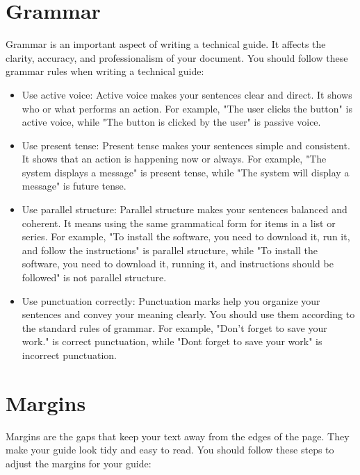\documentclass[12pt]{article}
\begin{document}
\pagebreak

\section{Grammar}

Grammar is an important aspect of writing a technical guide. It affects the clarity, accuracy, and professionalism of your document. You should follow these grammar rules when writing a technical guide:

\begin{itemize}
    \item Use active voice: Active voice makes your sentences clear and direct. It shows who or what performs an action. For example, "The user clicks the button" is active voice, while "The button is clicked by the user" is passive voice.
    \item Use present tense: Present tense makes your sentences simple and consistent. It shows that an action is happening now or always. For example, "The system displays a message" is present tense, while "The system will display a message" is future tense.
    \item Use parallel structure: Parallel structure makes your sentences balanced and coherent. It means using the same grammatical form for items in a list or series. For example, "To install the software, you need to download it, run it, and follow the instructions" is parallel structure, while "To install the software, you need to download it, running it, and instructions should be followed" is not parallel structure.
    \item Use punctuation correctly: Punctuation marks help you organize your sentences and convey your meaning clearly. You should use them according to the standard rules of grammar. For example, "Don't forget to save your work." is correct punctuation, while "Dont forget to save your work" is incorrect punctuation.
\end{itemize}

\pagebreak

\section{Margins}

Margins are the gaps that keep your text away from the edges of the page. They make your guide look tidy and easy to read. You should follow these steps to adjust the margins for your guide:
\end{document}
